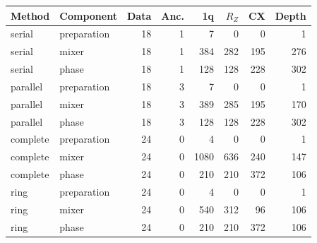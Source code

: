 \begin{tabular}{llrrrrrr}
\toprule
Method & Component & Data & Anc. & 1q & $R_Z$ & CX & Depth\\
\midrule
serial & preparation & 18 & 1 & 7 & 0 & 0 & 1\\
serial & mixer & 18 & 1 & 384 & 282 & 195 & 276\\
serial & phase & 18 & 1 & 128 & 128 & 228 & 302\\
parallel & preparation & 18 & 3 & 7 & 0 & 0 & 1\\
parallel & mixer & 18 & 3 & 389 & 285 & 195 & 170\\
parallel & phase & 18 & 3 & 128 & 128 & 228 & 302\\
complete & preparation & 24 & 0 & 4 & 0 & 0 & 1\\
complete & mixer & 24 & 0 & 1080 & 636 & 240 & 147\\
complete & phase & 24 & 0 & 210 & 210 & 372 & 106\\
ring & preparation & 24 & 0 & 4 & 0 & 0 & 1\\
ring & mixer & 24 & 0 & 540 & 312 & 96 & 106\\
ring & phase & 24 & 0 & 210 & 210 & 372 & 106\\
\bottomrule
\end{tabular}
